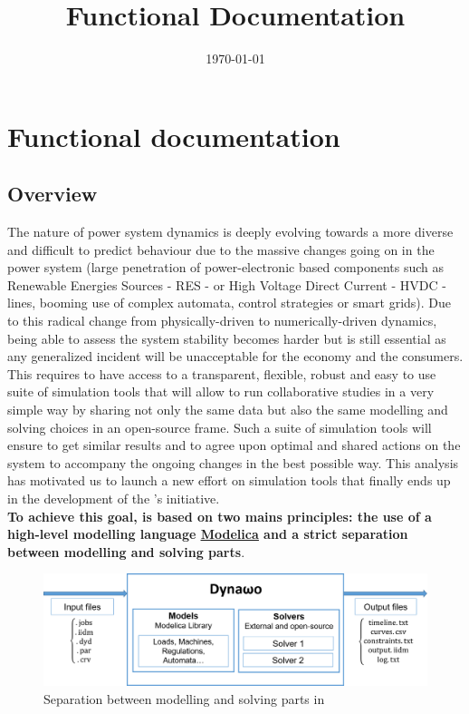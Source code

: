 \documentclass[a4paper, 12pt]{report}
\begin{document}
\title{\Dynawo Functional Documentation}
\date\today

\maketitle
\tableofcontents

\chapter{Functional documentation}

\section[Dynawo Overview]{\Dynawo Overview}

The nature of power system dynamics is deeply evolving towards a more diverse and difficult to predict behaviour due to the massive changes going on in the power system (large penetration of power-electronic based components such as Renewable Energies Sources - RES - or High Voltage Direct Current - HVDC - lines, booming use of complex automata, control strategies or smart grids). Due to this radical change from physically-driven to numerically-driven dynamics, being able to assess the system stability becomes harder but is still essential as any generalized incident will be unacceptable for the economy and the consumers. This requires to have access to a transparent, flexible, robust and easy to use suite of simulation tools that will allow to run collaborative studies in a very simple way by sharing not only the same data but also the same modelling and solving choices in an open-source frame. Such a suite of simulation tools will ensure to get similar results and to agree upon optimal and shared actions on the system to accompany the ongoing changes in the best possible way. This analysis has motivated us to launch a new effort on simulation tools that finally ends up in the development of the \Dynawo's initiative. \\

\textbf{To achieve this goal, \Dynawo is based on two mains principles: the use of a high-level modelling language \href{https://modelica.org/} {\underline{Modelica}} and a strict separation between modelling and solving parts}.\\

\begin{figure}[h!]
\centering
\includegraphics[width=\textwidth]{../resources/DynawoModelSolver.png}
\caption{Separation between modelling and solving parts in \Dynawo}
\end{figure}
\end{document}
